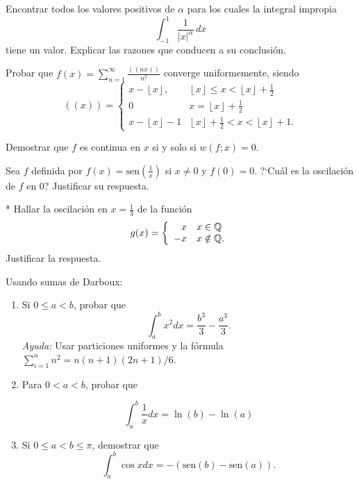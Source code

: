 \documentclass{book}
\newcommand{\qq}{\mathbb{Q}}
\begin{document}
\begin{ejer}{} Encontrar todos los valores positivos de $\alpha$ para los cuales la integral impropia 
\[
\int_{-1}^1 \frac{1}{|x|^{\alpha}}\,dx
\]
tiene un valor. Explicar las razones que conducen a su conclusión.

\end{ejer}  

\begin{ejer}{} Probar que  $f(x)=\sum\limits_{n=1}^{\infty} \frac{((nx))}{n^2}$ converge uniformemente,
siendo
\[
((x))=\left\{
\begin{array}{ll}
x-\left\lfloor x\right\rfloor, &\left\lfloor x\right\rfloor  \leq x < \left\lfloor x\right\rfloor+\frac{1}{2}
\\
0&x=\left\lfloor x\right\rfloor+\frac{1}{2}
\\
x-\left\lfloor x\right\rfloor-1 & \left\lfloor x\right\rfloor+\frac{1}{2} <x< \left\lfloor x\right\rfloor+1.
\end{array}
\right.
\]


\end{ejer} 

\begin{ejer}{} Demostrar que  $f$ es continua en $x$ si y solo si $w(f;x)=0$.



\end{ejer}

\begin{ejer}{} Sea $f$ definida por $f(x)=\text{sen} \left(\frac{1}{x}\right)$ si $x \neq 0$ y $f(0)=0$. 
?`Cuál es la oscilación de $f$ en 0? Justificar su respuesta.

\end{ejer} 

\begin{ejer}{}* Hallar la oscilación en $x=\frac{1}{3}$ de la función 
\[
g(x)=\left\{
\begin{array}{r l}
x & x\in \qq
\\
-x & x\notin\qq.
 \end{array}
\right.
\]
Justificar la respuesta.


\end{ejer} 

\begin{ejer}{} Usando sumas de Darboux: 
\begin{enumerate}
\item Si $0\leq a<b$, probar  que 
 \[
 \int_a^b x^2 dx=\frac{b^3}{3}-\frac{a^3}{3}.
\]
{\em Ayuda:} Usar particiones uniformes y la fórmula $\sum\limits_{i=1}^nn^2= n(n+1)(2n+1)/6$.

\item 
Para  $0< a<b$, probar que
 
\[
 \int_a^b \frac{1}{x} dx=
   \ln(b)-\ln(a) 
\]
\item 
Si $0\leq a<b\leq \pi$, demostrar que
\[
 \int_a^b \cos x dx=-(\text{sen}(b)-\text{sen}(a)).
\]

\end{enumerate}
\end{ejer} 
\end{document}
